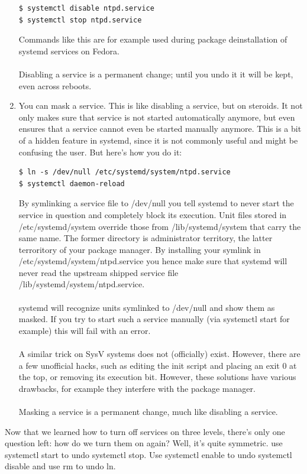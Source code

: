 \documentclass[titlepage]{article}
\begin{document}
\begin{enumerate}
\begin{lstlisting}
$ systemctl disable ntpd.service
$ systemctl stop ntpd.service
\end{lstlisting}
Commands like this are for example used during package deinstallation of systemd services on Fedora.
\\
\\
Disabling a service is a permanent change; until you undo it it will be kept, even across reboots.
\item
You can mask a service. This is like disabling a service, but on steroids. It not only makes sure that service is not started automatically anymore, but even ensures that a service cannot even be started manually anymore. This is a bit of a hidden feature in systemd, since it is not commonly useful and might be confusing the user. But here's how you do it:
\begin{lstlisting}
$ ln -s /dev/null /etc/systemd/system/ntpd.service
$ systemctl daemon-reload
\end{lstlisting}
By symlinking a service file to /dev/null you tell systemd to never start the service in question and completely block its execution. Unit files stored in /etc/systemd/system override those from /lib/systemd/system that carry the same name. The former directory is administrator territory, the latter terroritory of your package manager. By installing your symlink in /etc/systemd/system/ntpd.service you hence make sure that systemd will never read the upstream shipped service file /lib/systemd/system/ntpd.service.
\\
\\
systemd will recognize units symlinked to /dev/null and show them as masked. If you try to start such a service manually (via systemctl start for example) this will fail with an error.
\\
\\
A similar trick on SysV systems does not (officially) exist. However, there are a few unofficial hacks, such as editing the init script and placing an exit 0 at the top, or removing its execution bit. However, these solutions have various drawbacks, for example they interfere with the package manager.
\\
\\
Masking a service is a permanent change, much like disabling a service.
\end{enumerate}
Now that we learned how to turn off services on three levels, there's only one question left: how do we turn them on again? Well, it's quite symmetric. use systemctl start to undo systemctl stop. Use systemctl enable to undo systemctl disable and use rm to undo ln.
\end{document}
